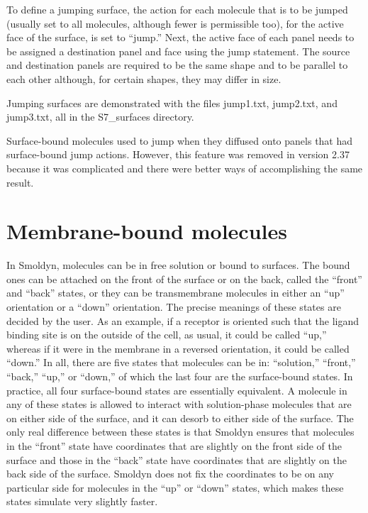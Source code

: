 \documentclass {scrbook}
\begin{document}
To define a jumping surface, the action for each molecule that is to be jumped (usually set to all molecules, although fewer is permissible too), for the active face of the surface, is set to ``jump.'' Next, the active face of each panel needs to be assigned a destination panel and face using the jump statement. The source and destination panels are required to be the same shape and to be parallel to each other although, for certain shapes, they may differ in size.

Jumping surfaces are demonstrated with the files jump1.txt, jump2.txt, and jump3.txt, all in the S7\_surfaces directory.

Surface-bound molecules used to jump when they diffused onto panels that had surface-bound jump actions. However, this feature was removed in version 2.37 because it was complicated and there were better ways of accomplishing the same result.

\section{Membrane-bound molecules}

In Smoldyn, molecules can be in free solution or bound to surfaces. The bound ones can be attached on the front of the surface or on the back, called the ``front'' and ``back'' states, or they can be transmembrane molecules in either an ``up'' orientation or a ``down'' orientation. The precise meanings of these states are decided by the user. As an example, if a receptor is oriented such that the ligand binding site is on the outside of the cell, as usual, it could be called ``up,'' whereas if it were in the membrane in a reversed orientation, it could be called ``down.'' In all, there are five states that molecules can be in: ``solution,'' ``front,'' ``back,'' ``up,'' or ``down,'' of which the last four are the surface-bound states. In practice, all four surface-bound states are essentially equivalent. A molecule in any of these states is allowed to interact with solution-phase molecules that are on either side of the surface, and it can desorb to either side of the surface. The only real difference between these states is that Smoldyn ensures that molecules in the ``front'' state have coordinates that are slightly on the front side of the surface and those in the ``back'' state have coordinates that are slightly on the back side of the surface. Smoldyn does not fix the coordinates to be on any particular side for molecules in the ``up'' or ``down'' states, which makes these states simulate very slightly faster.
\end{document}
